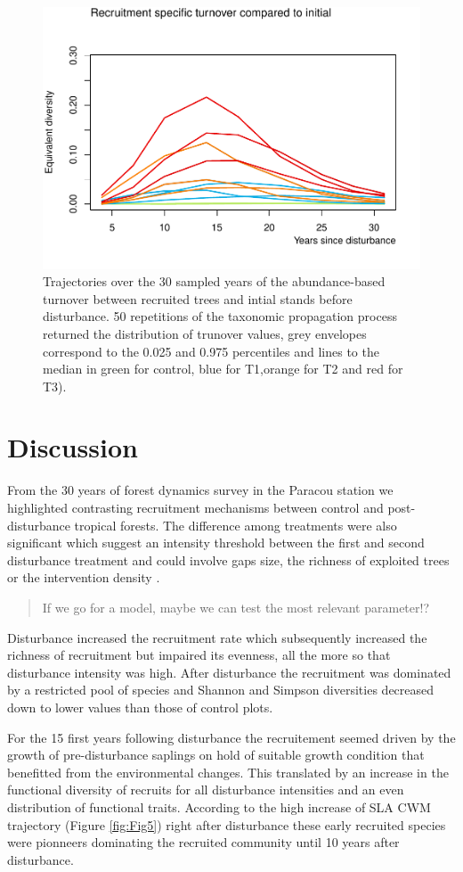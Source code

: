 \documentclass[fleqn,10pt]{ArtEcoFoG} %
\begin{document}
\begin{figure}

{\centering \includegraphics[width=0.5\linewidth]{RecruitmentTrajectories_files/figure-latex/Fig6-1} 

}

\caption{Trajectories over the 30 sampled years of the abundance-based turnover between recruited trees and intial stands before disturbance. 50 repetitions of the taxonomic propagation process returned the distribution of trunover values, grey envelopes correspond to the 0.025 and 0.975 percentiles and lines to the median in green for control, blue for T1,orange for T2 and red for T3).}\label{fig:Fig6}
\end{figure}

\section{Discussion}\label{discussion}

From the 30 years of forest dynamics survey in the Paracou station we
highlighted contrasting recruitment mechanisms between control and
post-disturbance tropical forests. The difference among treatments were
also significant which suggest an intensity threshold between the first
and second disturbance treatment and could involve gaps size, the
richness of exploited trees or the intervention density
\citep{Denslow1980}.

\begin{quote}
If we go for a model, maybe we can test the most relevant parameter!?
\end{quote}

Disturbance increased the recruitment rate which subsequently increased
the richness of recruitment but impaired its evenness, all the more so
that disturbance intensity was high. After disturbance the recruitment
was dominated by a restricted pool of species and Shannon and Simpson
diversities decreased down to lower values than those of control plots.

For the 15 first years following disturbance the recruitement seemed
driven by the growth of pre-disturbance saplings on hold of suitable
growth condition that benefitted from the environmental changes. This
translated by an increase in the functional diversity of recruits for
all disturbance intensities and an even distribution of functional
traits. According to the high increase of SLA CWM trajectory (Figure
\ref{fig:Fig5}) right after disturbance these early recruited species
were pionneers dominating the recruited community until 10 years after
disturbance.
\end{document}
